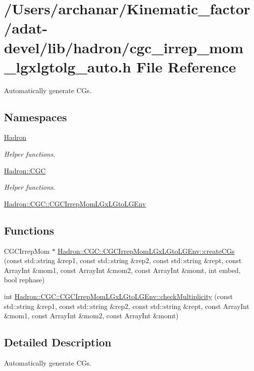 \hypertarget{adat-devel_2lib_2hadron_2cgc__irrep__mom__lgxlgtolg__auto_8h}{}\section{/\+Users/archanar/\+Kinematic\+\_\+factor/adat-\/devel/lib/hadron/cgc\+\_\+irrep\+\_\+mom\+\_\+lgxlgtolg\+\_\+auto.h File Reference}
\label{adat-devel_2lib_2hadron_2cgc__irrep__mom__lgxlgtolg__auto_8h}


Automatically generate C\+Gs.  


\subsection*{Namespaces}
\begin{DoxyCompactItemize}
\item 
 \mbox{\hyperlink{namespaceHadron}{Hadron}}
\begin{DoxyCompactList}\small\item\em Helper functions. \end{DoxyCompactList}\item 
 \mbox{\hyperlink{namespaceHadron_1_1CGC}{Hadron\+::\+C\+GC}}
\begin{DoxyCompactList}\small\item\em Helper functions. \end{DoxyCompactList}\item 
 \mbox{\hyperlink{namespaceHadron_1_1CGC_1_1CGCIrrepMomLGxLGtoLGEnv}{Hadron\+::\+C\+G\+C\+::\+C\+G\+C\+Irrep\+Mom\+L\+Gx\+L\+Gto\+L\+G\+Env}}
\end{DoxyCompactItemize}
\subsection*{Functions}
\begin{DoxyCompactItemize}
\item 
C\+G\+C\+Irrep\+Mom $\ast$ \mbox{\hyperlink{namespaceHadron_1_1CGC_1_1CGCIrrepMomLGxLGtoLGEnv_aac28a74a71012455c31bc9ba558b35da}{Hadron\+::\+C\+G\+C\+::\+C\+G\+C\+Irrep\+Mom\+L\+Gx\+L\+Gto\+L\+G\+Env\+::create\+C\+Gs}} (const std\+::string \&rep1, const std\+::string \&rep2, const std\+::string \&rept, const Array\+Int \&mom1, const Array\+Int \&mom2, const Array\+Int \&momt, int embed, bool rephase)
\item 
int \mbox{\hyperlink{namespaceHadron_1_1CGC_1_1CGCIrrepMomLGxLGtoLGEnv_ac903fc6025ce80a33975cbd2b635e7df}{Hadron\+::\+C\+G\+C\+::\+C\+G\+C\+Irrep\+Mom\+L\+Gx\+L\+Gto\+L\+G\+Env\+::check\+Multiplicity}} (const std\+::string \&rep1, const std\+::string \&rep2, const std\+::string \&rept, const Array\+Int \&mom1, const Array\+Int \&mom2, const Array\+Int \&momt)
\end{DoxyCompactItemize}


\subsection{Detailed Description}
Automatically generate C\+Gs. 

